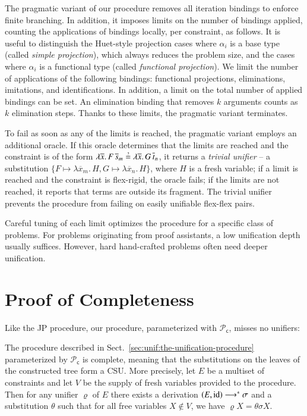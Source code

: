 The pragmatic variant of our procedure removes all iteration bindings to enforce finite branching. 
In addition, it
imposes limits 
on the number of bindings applied,
counting the applications of bindings locally, per
constraint, as follows. 
It is useful to distinguish the Huet-style projection cases where
$\alpha_i$ is a base type (called \emph{simple projection}), which always
reduces the problem size, and the cases where $\alpha_i$ is a functional type (called \emph{functional
projection}). We limit the number of applications of the following bindings:
functional projections, eliminations, imitations, and identifications.
In addition,
a limit on the total number of applied bindings can be set. 
An elimination binding that removes $k$ arguments counts as $k$
elimination steps.
Thanks to these limits, the pragmatic variant 
terminates.

To fail as soon as any of the limits
is reached, the pragmatic variant employs an additional oracle.
If this oracle determines that the limits are reached and the constraint is of the form
$\lambda \overline{x}.\, F \, \overline{s}_m \unif \lambda \overline{x}.\, G \, \overline{t}_n$, it returns a \emph{trivial unifier} --
a substitution $\{ F \mapsto \lambda \overline{x}_m.\, H, G \mapsto \lambda \overline{x}_n.\, H \}$, where $H$ is a fresh variable; if a limit is reached and
the constraint is flex-rigid, the oracle fails; if the limits are not reached, 
it reports that terms are outside its fragment. The trivial unifier prevents the procedure from failing on
easily unifiable flex-flex pairs.

Careful tuning of each limit optimizes the procedure for a specific class of problems. 
For problems originating from proof assistants, a low unification depth usually suffices. However, hard
hand-crafted problems often need
deeper unification.




\section{Proof of Completeness}
\label{sec:unif:proof-of-completeness}

Like the JP procedure, our procedure, parameterized with $\mathcal{P}_\mathsf{c}$,  misses no unifiers:

\begin{theorem}
\label{thm:completeness}
The procedure described in Sect.~\ref{sec:unif:the-unification-procedure}
parameterized by $\mathcal{P}_\mathsf{c}$ is complete, meaning that the
substitutions on the leaves of the constructed tree form a CSU.
More precisely, let $E$ be a multiset of constraints
and let $V$ be the supply of fresh variables provided to the procedure. 
Then for any unifier $\varrho$ of $E$ there exists
a derivation $\left(E,\makeop{id}\right)\longrightarrow^{*}\sigma$ and a
substitution $\theta$ such that for all free variables $X\not\in V$, we have $\varrho X = \theta\sigma X$.
\end{theorem}

